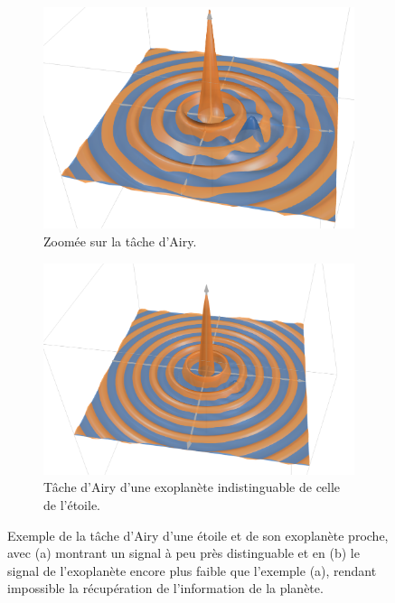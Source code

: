
\begin{figure}[htbp]
    \centering
    \begin{subfigure}[b]{0.45\textwidth}
        \centering
        \includegraphics[width=\textwidth]{figures/st_pl_sgn.png}
        \caption{Zoomée sur la tâche d'Airy.}
    \end{subfigure}
    \hfill
    \begin{subfigure}[b]{0.45\textwidth}
        \centering
        \includegraphics[width=\textwidth]{figures/larg_st_pl_sgn.png}
        \caption{Tâche d'Airy d'une exoplanète indistinguable de celle de l'étoile.}
    \end{subfigure}
    \caption{Exemple de la tâche d'Airy d'une étoile et de son exoplanète proche, avec (a) montrant un signal à peu près distinguable et en (b) le signal de l'exoplanète encore plus faible que l'exemple (a), rendant impossible la récupération de l'information de la planète.}
\end{figure}


